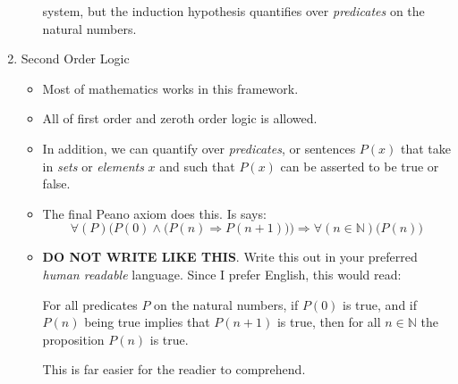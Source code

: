 \documentclass{article}
\begin{document}
\begin{enumerate}
\begin{itemize}
                        system,  but the induction hypothesis quantifies over
                        \textit{predicates} on the natural numbers.
                \end{itemize}
            \item
                Second Order Logic
                \begin{itemize}
                    \item
                        Most of mathematics works in this framework.
                    \item
                        All of first order and zeroth order
                        logic is allowed.
                    \item
                        In addition, we can quantify over \textit{predicates},
                        or sentences
                        $P(x)$ that take in \textit{sets} or
                        \textit{elements} $x$ and such
                        that $P(x)$ can be asserted to be true or false.
                    \item
                        The final Peano axiom does this. Is says:
                        \[
                            \forall(P)\Big(
                                P(0)
                                \land
                                \big(P(n)\Rightarrow{P}(n+1)\big)
                            \Big)
                            \Rightarrow
                            \forall(n\in\mathbb{N})\big(P(n)\big)
                        \]
                    \item
                        \textbf{DO NOT WRITE LIKE THIS}.
                        Write this out in your preferred
                        \textit{human readable} language. Since I prefer
                        English, this would read:
                        \begin{center}
                            For all predicates $P$
                            on the natural numbers, if $P(0)$ is true,
                            and if $P(n)$ being
                            true implies that $P(n+1)$ is true, then for all
                            $n\in\mathbb{N}$ the proposition $P(n)$ is true.
                        \end{center}
                        This is far easier for the readier to comprehend.
                \end{itemize}
        \end{enumerate}
\end{document}
